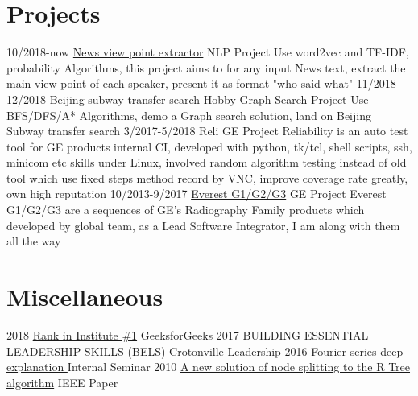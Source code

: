 \documentclass[letterpaper,10pt]{Resume_Liang}
\begin{document}
\begin{body}
\section{Projects}
\begin{entrylist}
  \projectentry
    {10/2018-now}
    {\href{https://github.com/wangliangster/TestWL/blob/master/ViewPointExtract.ipynb}{News view point extractor}}
    {NLP Project}
    {Use word2vec and TF-IDF, probability Algorithms, this project aims to for any input News text, extract the main view point of each speaker, present it as format "who said what" }
  \projectentry
    {11/2018-12/2018}
    {\href{https://github.com/wangliangster/NLP-Course/blob/master/BeijingSubway.ipynb}{Beijing subway transfer search}}
    {Hobby Graph Search Project}
    {Use BFS/DFS/A* Algorithms, demo a Graph search solution, land on Beijing Subway transfer search}
    \projectentry
    {3/2017-5/2018}
    {Reli}
    {GE Project}
    {Reliability is an auto test tool for GE products internal CI, developed with python, tk/tcl, shell scripts, ssh, minicom etc skills under Linux, involved random algorithm testing instead of old tool which use fixed steps method record by VNC, improve coverage rate greatly, own high reputation }
     \projectentry
    {10/2013-9/2017}
    {\href{https://www.gehealthcare.com/en/products/radiography/fixed-rad-systems}{Everest G1/G2/G3}}
    {GE Project}
    {Everest G1/G2/G3 are a sequences of GE's Radiography Family products which developed by global team, as a Lead Software Integrator, I am along with them all the way }
\end{entrylist}

\section{Miscellaneous}
\begin{entrylist}
   \otherentry
   {2018}
   {\href{https://auth.geeksforgeeks.org/user/\%E7\%8E\%8B\%E8\%89\%AF/practice/}{Rank in Institute \#1}}
   {GeeksforGeeks}
    \otherentry
    {2017}
    {BUILDING ESSENTIAL LEADERSHIP SKILLS (BELS) }
    {Crotonville Leadership}
     \otherentry
    {2016}
    {\href{https://github.com/wangliangster/TestWL/blob/master/Fouries\%20Transfer\%20Notes3.pdf}{Fourier series deep explanation }}
    {Internal Seminar }
    \otherentry
    {2010}
    {\href{https://ieeexplore.ieee.org/document/5564214}{A new solution of node splitting to the R Tree algorithm}}
    {IEEE Paper}
\end{entrylist}
\end{body}
\end{document}
